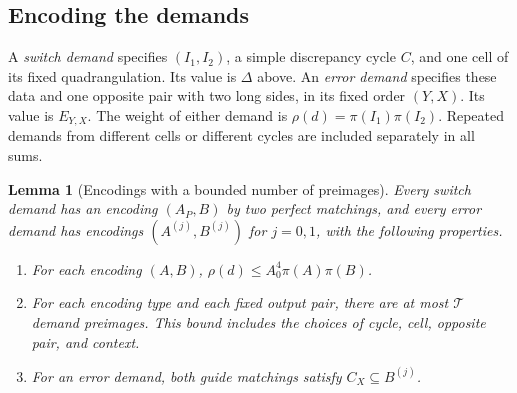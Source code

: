\documentclass[11pt]{article}
\newtheorem{lemma}[theorem]{Lemma}
\theoremstyle{definition}
\theoremstyle{remark}
\newcommand{\calT}{\mathcal T}
\numberwithin{equation}{section}
\begin{document}
\subsection{Encoding the demands}

A \emph{switch demand} specifies $(I_1,I_2)$, a simple discrepancy
cycle $C$, and one cell of its fixed quadrangulation.  Its value is
$\Delta$ above.  An \emph{error demand} specifies these data and one
opposite pair with two long sides, in its fixed order $(Y,X)$.
Its value is $E_{Y,X}$.  The weight of either demand is
$\rho(d)=\pi(I_1)\pi(I_2)$.  Repeated demands from different cells or
different cycles are included separately in all sums.

\begin{lemma}[Encodings with a bounded number of preimages]
\label{lem:encoding}
Every switch demand has an encoding $(A_P,B)$ by two perfect
matchings, and every error demand has encodings
$(A^{(j)},B^{(j)})$ for $j=0,1$, with the following properties.
\begin{enumerate}[label=\textup{(\roman*)}]
 \item For each encoding $(A,B)$,
 $\rho(d)\le A_0^4\pi(A)\pi(B)$.
 \item For each encoding type and each fixed output pair, there are
 at most $\calT$ demand preimages.  This bound includes the choices
 of cycle, cell, opposite pair, and context.
 \item For an error demand, both guide matchings satisfy
 $C_X\subseteq B^{(j)}$.
\end{enumerate}
\end{lemma}
\end{document}
